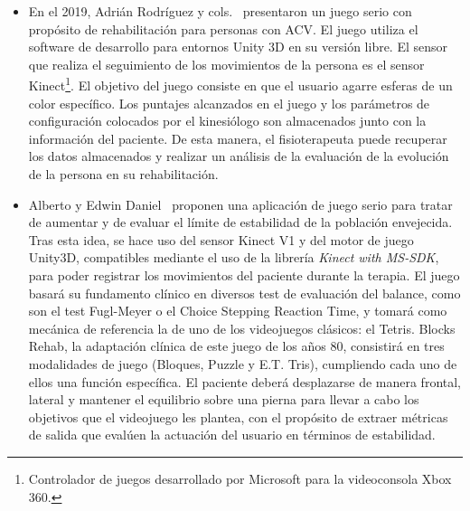 \begin{itemize}
    \item En el 2019, Adrián Rodríguez y cols.~\cite{rodriguez2019design} presentaron un juego serio con propósito de rehabilitación para personas con ACV. El juego utiliza el software de desarrollo para entornos Unity 3D en su versión libre. El sensor que realiza el seguimiento de los movimientos de la persona es el sensor Kinect\footnote{Controlador de juegos desarrollado por Microsoft para la videoconsola Xbox 360.}. El objetivo del juego consiste en que el usuario agarre esferas de un color específico. Los puntajes alcanzados en el juego y los parámetros de configuración colocados por el kinesiólogo son almacenados junto con la información del paciente. De esta manera, el fisioterapeuta puede recuperar los datos almacenados y realizar un análisis de la evaluación de la evolución de la persona en su rehabilitación. 
    
    \item Alberto y Edwin Daniel~\cite{morales2019desarrollo} proponen una aplicación de juego serio para tratar de aumentar y de evaluar el límite de estabilidad de la población envejecida. Tras esta idea, se hace uso del sensor Kinect V1 y del motor de juego Unity3D, compatibles mediante el uso de la librería \textit{Kinect with MS-SDK}, para poder registrar los movimientos del paciente durante la terapia. El juego basará su fundamento clínico en diversos test de evaluación del balance, como son el test Fugl-Meyer o el Choice Stepping Reaction Time, y tomará como mecánica de referencia la de uno de los videojuegos clásicos: el Tetris. Blocks Rehab, la adaptación clínica de este juego de los años 80, consistirá en tres modalidades de juego (Bloques, Puzzle y E.T. Tris), cumpliendo cada uno de ellos una función específica. El paciente deberá desplazarse de manera frontal, lateral y mantener el equilibrio sobre una pierna para llevar a cabo los objetivos que el videojuego les plantea, con el propósito de extraer métricas de salida que evalúen la actuación del usuario en términos de estabilidad. 
    

\end{itemize}
